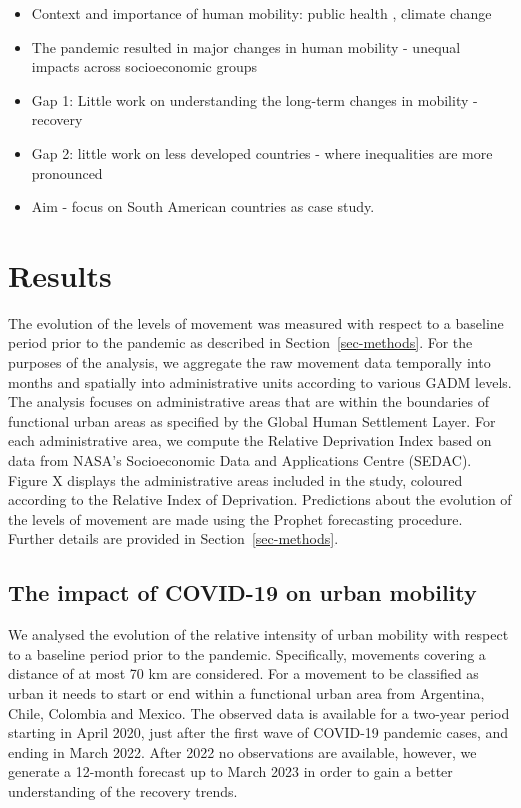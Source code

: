 \documentclass[
  11pt,
]{article}
\providecommand{\tightlist}{%
  \setlength{\itemsep}{0pt}\setlength{\parskip}{0pt}}\usepackage{longtable,booktabs,array}
\begin{document}
\begin{itemize}
\tightlist
\item
  Context and importance of human mobility: public health , climate
  change\\
\item
  The pandemic resulted in major changes in human mobility - unequal
  impacts across socioeconomic groups\\
\item
  Gap 1: Little work on understanding the long-term changes in mobility
  - recovery\\
\item
  Gap 2: little work on less developed countries - where inequalities
  are more pronounced\\
\item
  Aim - focus on South American countries as case study.
\end{itemize}

\section{Results}\label{sec-results}

The evolution of the levels of movement was measured with respect to a
baseline period prior to the pandemic as described in
Section~\ref{sec-methods}. For the purposes of the analysis, we
aggregate the raw movement data temporally into months and spatially
into administrative units according to various GADM levels. The analysis
focuses on administrative areas that are within the boundaries of
functional urban areas as specified by the Global Human Settlement
Layer. For each administrative area, we compute the Relative Deprivation
Index based on data from NASA's Socioeconomic Data and Applications
Centre (SEDAC). Figure X displays the administrative areas included in
the study, coloured according to the Relative Index of Deprivation.
Predictions about the evolution of the levels of movement are made using
the Prophet forecasting procedure. Further details are provided in
Section~\ref{sec-methods}.

\subsection{The impact of COVID-19 on urban
mobility}\label{the-impact-of-covid-19-on-urban-mobility}

We analysed the evolution of the relative intensity of urban mobility
with respect to a baseline period prior to the pandemic. Specifically,
movements covering a distance of at most 70 km are considered. For a
movement to be classified as urban it needs to start or end within a
functional urban area from Argentina, Chile, Colombia and Mexico. The
observed data is available for a two-year period starting in April 2020,
just after the first wave of COVID-19 pandemic cases, and ending in
March 2022. After 2022 no observations are available, however, we
generate a 12-month forecast up to March 2023 in order to gain a better
understanding of the recovery trends.
\end{document}
